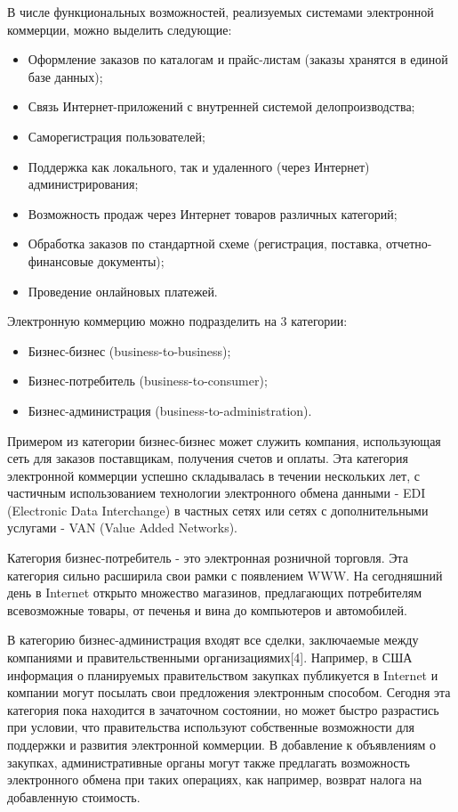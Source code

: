 В числе функциональных возможностей, реализуемых системами электронной коммерции, можно выделить следующие:
\begin{itemize}
  \item Оформление заказов по каталогам и прайс-листам (заказы хранятся в единой базе данных);
  \item Связь Интернет-приложений с внутренней системой делопроизводства;
  \item Саморегистрация пользователей;
  \item Поддержка как локального, так и удаленного (через Интернет) администрирования;
  \item Возможность продаж через Интернет товаров различных категорий;
  \item Обработка заказов по стандартной схеме (регистрация, поставка, отчетно-финансовые документы);
  \item Проведение онлайновых платежей.
\end{itemize}

Электронную коммерцию можно подразделить на 3 категории:
\begin{itemize}
  \item Бизнес-бизнес (business-to-business);
  \item Бизнес-потребитель (business-to-consumer);
  \item Бизнес-администрация (business-to-administration).
\end{itemize}

Примером из категории бизнес-бизнес может служить компания, использующая сеть для заказов поставщикам, получения счетов и оплаты.
Эта категория электронной коммерции успешно складывалась в течении нескольких лет, с частичным использованием технологии электронного обмена данными - EDI (Electronic Data Interchange) в частных сетях или сетях с дополнительными услугами - VAN (Value Added Networks).

Категория бизнес-потребитель - это электронная розничной торговля. Эта категория сильно расширила свои рамки с появлением WWW.
На сегодняшний день в Internet открыто множество магазинов, предлагающих потребителям всевозможные товары, от печенья и вина до компьютеров и автомобилей.

В категорию бизнес-администрация входят все сделки, заключаемые между компаниями и правительственными организациямих[4].
Например, в США информация о планируемых правительством закупках публикуется в Internet и компании могут посылать свои предложения электронным способом.
Сегодня эта категория пока находится в зачаточном состоянии, но может быстро разрастись при условии, что правительства используют собственные возможности для поддержки и развития электронной коммерции.
В добавление к объявлениям о закупках, административные органы могут также предлагать возможность электронного обмена при таких операциях, как например, возврат налога на добавленную стоимость.

